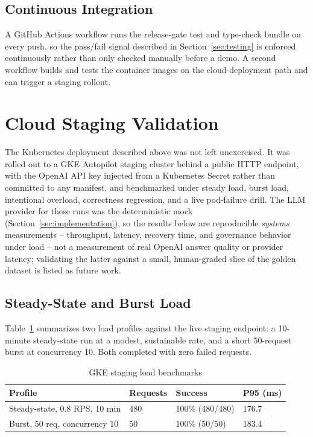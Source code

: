 \documentclass[conference]{IEEEtran}
\begin{document}
\subsection{Continuous Integration}
A GitHub Actions workflow runs the release-gate test and type-check bundle
on every push, so the pass/fail signal described in
Section~\ref{sec:testing} is enforced continuously rather than only
checked manually before a demo. A second workflow builds and tests the
container images on the cloud-deployment path and can trigger a staging
rollout.

\section{Cloud Staging Validation}
\label{sec:staging}

The Kubernetes deployment described above was not left unexercised. It was
rolled out to a GKE Autopilot staging cluster behind a public HTTP
endpoint, with the OpenAI API key injected from a Kubernetes Secret rather
than committed to any manifest, and benchmarked under steady load, burst
load, intentional overload, correctness regression, and a live
pod-failure drill. The LLM provider for these runs was the deterministic
mock (Section~\ref{sec:implementation}), so the results below are
reproducible \emph{systems} measurements -- throughput, latency, recovery
time, and governance behavior under load -- not a measurement of real
OpenAI answer quality or provider latency; validating the latter against a
small, human-graded slice of the golden dataset is listed as future work.

\subsection{Steady-State and Burst Load}
Table~\ref{tab:staging-load} summarizes two load profiles against the live
staging endpoint: a 10-minute steady-state run at a modest, sustainable
rate, and a short 50-request burst at concurrency 10. Both completed with
zero failed requests.

\begin{table}[t]
\centering
\caption{GKE staging load benchmarks}
\label{tab:staging-load}
\footnotesize
\begin{tabular}{@{}p{1.9cm}p{1.7cm}p{1.5cm}p{1.5cm}@{}}
\toprule
\textbf{Profile} & \textbf{Requests} & \textbf{Success} & \textbf{P95 (ms)} \\
\midrule
Steady-state, 0.8 RPS, 10 min & 480 & 100\% (480/480) & 176.7 \\
Burst, 50 req, concurrency 10 & 50 & 100\% (50/50) & 183.4 \\
\bottomrule
\end{tabular}
\end{table}
\end{document}
